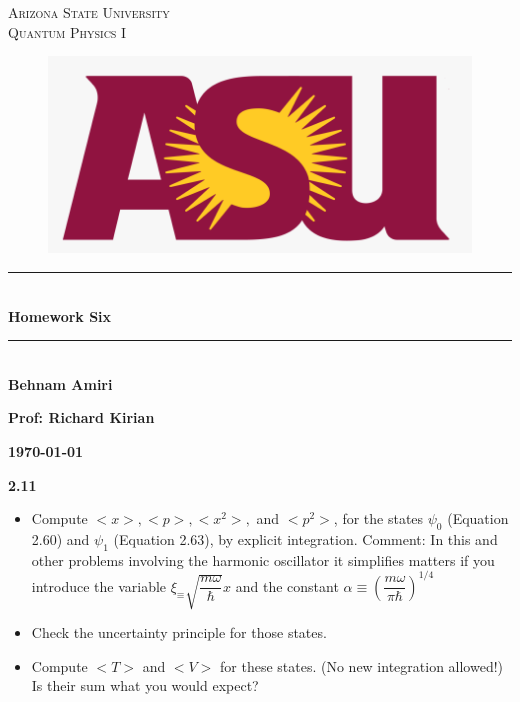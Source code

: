\documentclass[fleqn]{article}
\begin{document}
  \begin{titlepage}

    \newcommand{\HRule}{\rule{\linewidth}{0.5mm}}

    \center


    \textsc{\LARGE Arizona State University}\\[1.5cm]

    \textsc{\LARGE Quantum Physics I }\\[1.5cm]


    \begin{figure}
      \includegraphics[width=\linewidth]{asu.png}
    \end{figure}


    \HRule \\[0.4cm]
    { \huge \bfseries Homework Six}\\[0.4cm] 
    \HRule \\[1.5cm]

    \textbf{Behnam Amiri}

    \bigbreak

    \textbf{Prof: Richard Kirian}

    \bigbreak

    \textbf{{\large \today}\\[2cm]}

    \vfill 

  \end{titlepage}

  \textbf{2.11}
  \begin{itemize}
    \item Compute $<x>, <p>, <x^2>,$ and $<p^2>$, for the states $\psi_0$ (Equation 2.60) and $\psi_1$ (Equation 2.63), by explicit integration. Comment: In this and other problems involving 
    the harmonic oscillator it simplifies matters if you introduce the variable $\xi_\equiv \sqrt{\dfrac{m \omega}{\hbar}}x$ and the constant 
    $\alpha \equiv (\dfrac{m \omega}{\pi \hbar})^{1/4}$

    \item Check the uncertainty principle for those states.

    \item Compute $<T>$ and $<V>$ for these states. (No new integration allowed!) Is their sum what you would expect?
  \end{itemize}
\end{document}
